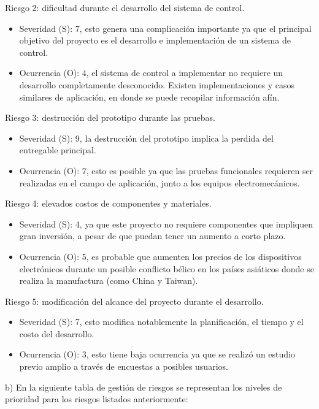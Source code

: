 \documentclass[
11pt, %
]{charter}
\begin{document}
Riesgo 2: dificultad durante el desarrollo del sistema de control.
\begin{itemize}
	\item Severidad (S): 7, esto genera una complicación importante ya que el principal objetivo del proyecto es el desarrollo e implementación de un sistema de control.
	\item Ocurrencia (O): 4, el sistema de control a implementar no requiere un desarrollo completamente desconocido. Existen implementaciones y casos similares de aplicación, en donde se puede recopilar información afín.
\end{itemize}

Riesgo 3: destrucción del prototipo durante las pruebas.
\begin{itemize}
	\item Severidad (S): 9, la destrucción del prototipo implica la perdida del entregable principal.
	\item Ocurrencia (O): 7, esto es posible ya que las pruebas funcionales requieren ser realizadas en el campo de aplicación, junto a los equipos electromecánicos.
\end{itemize}

Riesgo 4: elevados costos de componentes y materiales.
\begin{itemize}
	\item Severidad (S): 4, ya que este proyecto no requiere componentes que impliquen gran inversión, a pesar de que puedan tener un aumento a corto plazo.
	\item Ocurrencia (O): 5, es probable que aumenten los precios de los dispositivos electrónicos durante un posible conflicto bélico en los países asiáticos donde se realiza la manufactura (como China y Taiwan).
\end{itemize}

Riesgo 5: modificación del alcance del proyecto durante el desarrollo.
\begin{itemize}
	\item Severidad (S): 7, esto modifica notablemente la planificación, el tiempo y el costo del desarrollo.
	\item Ocurrencia (O): 3, esto tiene baja ocurrencia ya que se realizó un estudio previo amplio a través de encuestas a posibles usuarios.
\end{itemize}

b) En la siguiente tabla de gestión de riesgos se representan los niveles de prioridad para los riesgos listados anteriormente:
\end{document}
